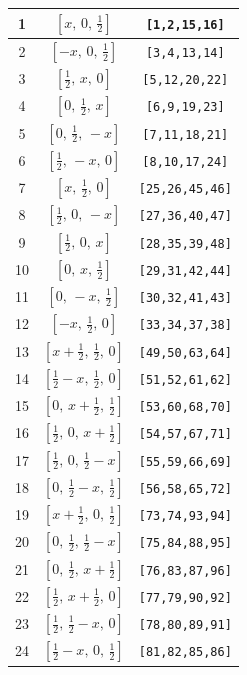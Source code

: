 \documentclass[fleqn,8pt]{jsarticle}
\begin{document}
\begin{longtable}{ccc}
1 & $\left[ x,\, 0,\, \frac{1}{2} \right]$ & {\tt [1,2,15,16]} \\ \hline
2 & $\left[ - x,\, 0,\, \frac{1}{2} \right]$ & {\tt [3,4,13,14]} \\ \hline
3 & $\left[ \frac{1}{2},\, x,\, 0 \right]$ & {\tt [5,12,20,22]} \\ \hline
4 & $\left[ 0,\, \frac{1}{2},\, x \right]$ & {\tt [6,9,19,23]} \\ \hline
5 & $\left[ 0,\, \frac{1}{2},\, - x \right]$ & {\tt [7,11,18,21]} \\ \hline
6 & $\left[ \frac{1}{2},\, - x,\, 0 \right]$ & {\tt [8,10,17,24]} \\ \hline
7 & $\left[ x,\, \frac{1}{2},\, 0 \right]$ & {\tt [25,26,45,46]} \\ \hline
8 & $\left[ \frac{1}{2},\, 0,\, - x \right]$ & {\tt [27,36,40,47]} \\ \hline
9 & $\left[ \frac{1}{2},\, 0,\, x \right]$ & {\tt [28,35,39,48]} \\ \hline
10 & $\left[ 0,\, x,\, \frac{1}{2} \right]$ & {\tt [29,31,42,44]} \\ \hline
11 & $\left[ 0,\, - x,\, \frac{1}{2} \right]$ & {\tt [30,32,41,43]} \\ \hline
12 & $\left[ - x,\, \frac{1}{2},\, 0 \right]$ & {\tt [33,34,37,38]} \\ \hline
13 & $\left[ x + \frac{1}{2},\, \frac{1}{2},\, 0 \right]$ & {\tt [49,50,63,64]} \\ \hline
14 & $\left[ \frac{1}{2} - x,\, \frac{1}{2},\, 0 \right]$ & {\tt [51,52,61,62]} \\ \hline
15 & $\left[ 0,\, x + \frac{1}{2},\, \frac{1}{2} \right]$ & {\tt [53,60,68,70]} \\ \hline
16 & $\left[ \frac{1}{2},\, 0,\, x + \frac{1}{2} \right]$ & {\tt [54,57,67,71]} \\ \hline
17 & $\left[ \frac{1}{2},\, 0,\, \frac{1}{2} - x \right]$ & {\tt [55,59,66,69]} \\ \hline
18 & $\left[ 0,\, \frac{1}{2} - x,\, \frac{1}{2} \right]$ & {\tt [56,58,65,72]} \\ \hline
19 & $\left[ x + \frac{1}{2},\, 0,\, \frac{1}{2} \right]$ & {\tt [73,74,93,94]} \\ \hline
20 & $\left[ 0,\, \frac{1}{2},\, \frac{1}{2} - x \right]$ & {\tt [75,84,88,95]} \\ \hline
21 & $\left[ 0,\, \frac{1}{2},\, x + \frac{1}{2} \right]$ & {\tt [76,83,87,96]} \\ \hline
22 & $\left[ \frac{1}{2},\, x + \frac{1}{2},\, 0 \right]$ & {\tt [77,79,90,92]} \\ \hline
23 & $\left[ \frac{1}{2},\, \frac{1}{2} - x,\, 0 \right]$ & {\tt [78,80,89,91]} \\ \hline
24 & $\left[ \frac{1}{2} - x,\, 0,\, \frac{1}{2} \right]$ & {\tt [81,82,85,86]} \\
\end{longtable}
\end{document}
